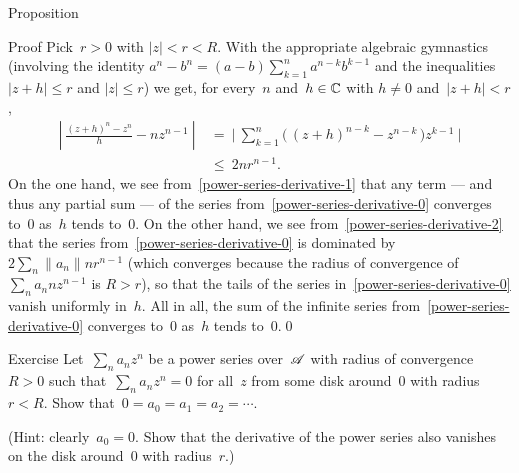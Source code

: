 \documentclass[a]{subfiles}
\begin{document}
\begin{parsec}
\begin{point}{Proposition}
\begin{point}{Proof}
Pick~$r>0$ with $\left|z\right| < r < R$.
With the appropriate algebraic gymnastics
(involving the identity
$a^n-b^n=(a-b)\sum_{k=1}^n a^{n-k}b^{k-1}$
and the inequalities $\left|z+h\right| \leq r$
and $\left|z\right|\leq r$)
we get, for every~$n$
and~$h\in \mathbb{C}$ with
$h\neq 0$ and~$\left|z+h\right|<r$,
\begin{align}
\left|\  \frac{(z+h)^n-z^n}{h}-nz^{n-1}\ \right|
\ &= \ 
\biggl|\ \sum_{k=1}^n \bigl(\,(z+h)^{n-k}-z^{n-k}\,\bigr)z^{k-1} \ \biggr|
\label{power-series-derivative-1}
\\ 
\label{power-series-derivative-2}
\ &\leq\ 
2nr^{n-1}.
\end{align}
On the one hand,
we see from~\eqref{power-series-derivative-1}
that any term
--- and thus any partial sum ---
of the series from~\eqref{power-series-derivative-0}
converges to~$0$ as~$h$ tends to~$0$.
On the other hand,
we see from~\eqref{power-series-derivative-2}
that the series 
from~\eqref{power-series-derivative-0}
is dominated by~$2\sum_n \|a_n\|nr^{n-1}$
(which converges
because the radius of convergence of $\sum_n a_n nz^{n-1}$
is $R>r$),
so that the tails of the series in~\eqref{power-series-derivative-0}
vanish uniformly in~$h$.
All in all, the sum of the infinite series
from~\eqref{power-series-derivative-0}
converges to~$0$ as~$h$ tends to~$0$.\qed
\end{point}
\end{point}
\begin{point}{Exercise}%
Let~$\sum_n a_n z^n$
be a power series over~$\mathscr{A}$
with radius of convergence~$R>0$
such that~$\sum_n a_n z^n=0$
for all~$z$ from
some disk around~$0$ with radius~$r<R$.
Show that~$0=a_0=a_1=a_2=\dotsb$.

(Hint: clearly~$a_0=0$.  Show that the derivative
of the power series also vanishes on the disk around~$0$
with radius~$r$.)
\end{point}
\end{parsec}%
\end{document}

